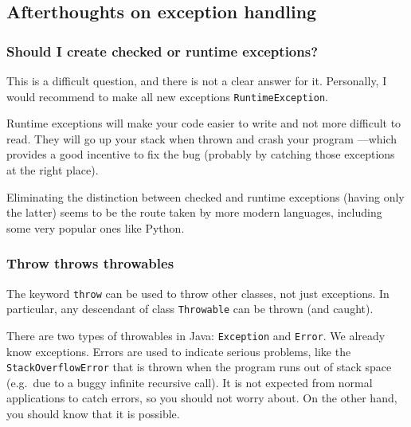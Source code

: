 

\subsection{Afterthoughts on exception handling}
\label{sec:afterth-except-handl}

\subsubsection{Should I create checked or runtime exceptions?}
\label{sec:should-i-create}

This is a difficult question, and there is not a clear answer for
it. Personally, I would recommend to make all new exceptions
\verb+RuntimeException+. 

Runtime exceptions will make your code easier to write
and not more difficult to read. They will go up your stack when thrown
and crash your program ---which provides a good incentive to fix
the bug (probably by catching those exceptions at the right place). 

Eliminating the distinction between 
checked and runtime exceptions (having only the latter) seems
to be the route taken by more modern languages, including some very
popular ones like Python.

\subsubsection{Throw throws throwables}
\label{sec:throw-throws-throw}

The keyword \verb+throw+ can be used to throw other classes, not just
exceptions. In particular, any descendant of class \verb+Throwable+
can be thrown (and caught). 

There are two types of throwables in Java: \verb+Exception+ and
\verb+Error+. We already know exceptions. Errors are used to indicate
serious problems, like the \verb+StackOverflowError+ that is thrown
when the program runs out of stack space (e.g.~due to a buggy infinite
recursive call). It is not expected from normal applications to catch
errors, so you should not worry about. On the other hand, you should
know that it is possible. 




